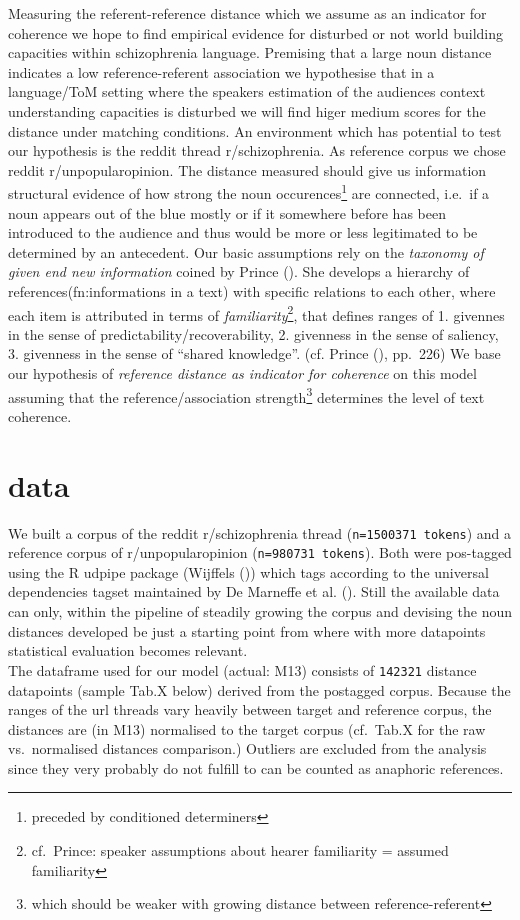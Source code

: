 \documentclass[12pt,a4paper]{article}
\begin{document}
Measuring the referent-reference distance which we assume as an indicator for coherence we hope to find empirical evidence for disturbed or not world building capacities within schizophrenia language. Premising that a large noun distance indicates a low reference-referent association we hypothesise that in a language/ToM setting where the speakers estimation of the audiences context understanding capacities is disturbed we will find higer medium scores for the distance under matching conditions. An environment which has potential to test our hypothesis is the reddit thread r/schizophrenia. As reference corpus we chose reddit r/unpopularopinion.
The distance measured should give us information structural evidence of how strong the noun occurences\footnote{preceded by conditioned determiners} are connected, i.e.~if a noun appears out of the blue mostly or if it somewhere before has been introduced to the audience and thus would be more or less legitimated to be determined by an antecedent.
Our basic assumptions rely on the \emph{taxonomy of given end new information} coined by Prince (). She develops a hierarchy of references(fn:informations in a text) with specific relations to each other, where each item is attributed in terms of \emph{familiarity}\footnote{cf.~Prince: speaker assumptions about hearer familiarity = assumed familiarity}, that defines ranges of 1. givennes in the sense of predictability/recoverability, 2. givenness in the sense of saliency, 3. givenness in the sense of ``shared knowledge''. (cf. Prince (), pp.~226) We base our hypothesis of \emph{reference distance as indicator for coherence} on this model assuming that the reference/association strength\footnote{which should be weaker with growing distance between reference-referent} determines the level of text coherence.

\section{data}\label{data}

We built a corpus of the reddit r/schizophrenia thread (\texttt{n=1500371\ tokens}) and a reference corpus of r/unpopularopinion (\texttt{n=980731\ tokens}). Both were pos-tagged using the R udpipe package (Wijffels ()) which tags according to the universal dependencies tagset maintained by De Marneffe et al. (). Still the available data can only, within the pipeline of steadily growing the corpus and devising the noun distances developed be just a starting point from where with more datapoints statistical evaluation becomes relevant.\\
The dataframe used for our model (actual: M13) consists of \texttt{142321} distance datapoints (sample Tab.X below) derived from the postagged corpus. Because the ranges of the url threads vary heavily between target and reference corpus, the distances are (in M13) normalised to the target corpus (cf.~Tab.X for the raw vs.~normalised distances comparison.) Outliers are excluded from the analysis since they very probably do not fulfill to can be counted as anaphoric references.
\end{document}
